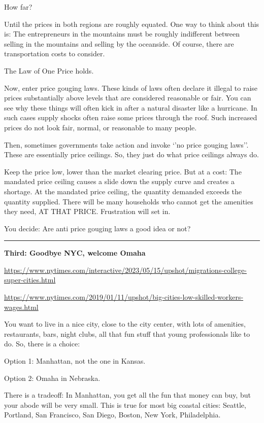 \documentclass[
]{book}
\begin{document}
How far?

Until the prices in both regions are roughly equated. One way to think about this is: The entrepreneurs in the mountains must be roughly indifferent between selling in the mountains and selling by the oceanside. Of course, there are transportation costs to consider.

The Law of One Price holds.

Now, enter price gouging laws. These kinds of laws often declare it illegal to raise prices substantially above levels that are considered reasonable or fair. You can see why these things will often kick in after a natural disaster like a hurricane. In such cases supply shocks often raise some prices through the roof. Such increased prices do not look fair, normal, or reasonable to many people.

Then, sometimes governments take action and invoke `'no price gouging laws''. These are essentially price ceilings. So, they just do what price ceilings always do.

Keep the price low, lower than the market clearing price. But at a cost: The mandated price ceiling causes a slide down the supply curve and creates a shortage. At the mandated price ceiling, the quantity demanded exceeds the quantity supplied. There will be many households who cannot get the amenities they need, AT THAT PRICE. Frustration will set in.

You decide: Are anti price gouging laws a good idea or not?

\begin{center}\rule{0.5\linewidth}{0.5pt}\end{center}

\textbf{Third: Goodbye NYC, welcome Omaha}

\url{https://www.nytimes.com/interactive/2023/05/15/upshot/migrations-college-super-cities.html}

\url{https://www.nytimes.com/2019/01/11/upshot/big-cities-low-skilled-workers-wages.html}

You want to live in a nice city, close to the city center, with lots of amenities, restaurants, bars, night clubs, all that fun stuff that young professionals like to do. So, there is a choice:

Option 1: Manhattan, not the one in Kansas.

Option 2: Omaha in Nebraska.

There is a tradeoff: In Manhattan, you get all the fun that money can buy, but your abode will be very small. This is true for most big coastal cities: Seattle, Portland, San Francisco, San Diego, Boston, New York, Philadelphia.
\end{document}
